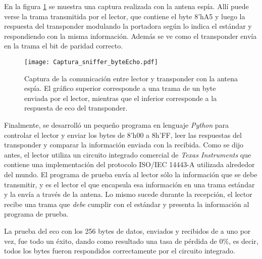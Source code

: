 En la figura \ref{fig:CapturaSniffer} se muestra una captura realizada 
con la antena espía. Allí puede verse la trama transmitida por el 
lector, que contiene el byte 8'hA5 y luego la respuesta del 
transponder modulando la portadora según lo indica el estándar y 
respondiendo con la misma información. Además se ve como el 
transponder envía en la trama el bit de paridad correcto.

\begin{figure}
	\centering
	\texttt{[image: Captura\_sniffer\_byteEcho.pdf]}
	\caption{Captura de la comunicación entre lector y transponder con 
	la antena espía. El gráfico superior corresponde a una trama de un 
	byte enviada por el lector, mientras que el inferior corresponde 
	a la respuesta de eco del transponder.}
	\label{fig:CapturaSniffer}
\end{figure}

Finalmente, se desarrolló un pequeño programa en lenguaje \emph{Python} 
para controlar el lector y enviar los bytes de 8'h00 a 8h'FF, leer 
las respuestas del transponder y comparar la información enviada con la 
recibida. Como se dijo antes, el lector utiliza un circuito integrado 
comercial de \emph{Texas Instruments} que contiene una implementación 
del protocolo ISO/IEC 14443-A utilizada alrededor del mundo. El 
programa de prueba envía al lector sólo la información que se debe 
transmitir, y es el lector el que encapsula esa información en una 
trama estándar y la envía a través de la antena. Lo mismo sucede 
durante la recepción, el lector recibe una trama que \emph{debe} 
cumplir con el estándar y presenta la información al programa de 
prueba.

La prueba del eco con los 256 bytes de datos, enviados y recibidos de 
a uno por vez, fue todo un éxito, dando como resultado una tasa de 
pérdida de 0\%, es decir, todos los bytes fueron respondidos 
correctamente por el circuito integrado. 
